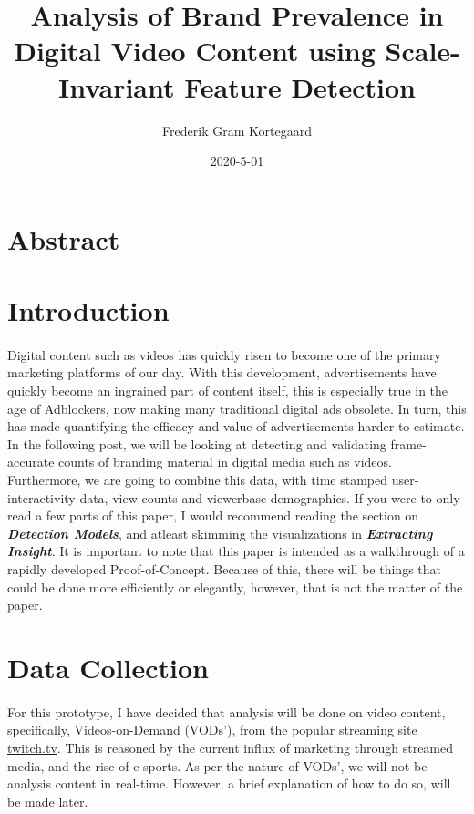 \documentclass{article}
\title{Analysis of Brand Prevalence in Digital Video Content using Scale-Invariant Feature Detection}
\date{2020-5-01}
\author{Frederik Gram Kortegaard}
\begin{document}
\maketitle
{}
\newpage
\tableofcontents
\newpage
{}

\section{Abstract}
\section{Introduction}
\paragraph{}
Digital content such as videos has quickly risen to become one of the primary marketing platforms
of our day. With this development, advertisements have quickly become an ingrained part of content
itself, this is especially true in the age of Adblockers, now making many traditional digital
ads obsolete. In turn, this has made quantifying the efficacy and value
of advertisements harder to estimate. 
\newline\newline
In the following post, we will be
looking at detecting and validating frame-accurate counts of branding
material in digital media such as videos. Furthermore, we are going to
combine this data, with time stamped user-interactivity data, view counts
and viewerbase demographics.
\newline\newline
If you were to only read a few parts of this paper, I would recommend
reading the section on \textbf{\textit{Detection Models}}, and atleast skimming the visualizations
in \textbf{\textit{Extracting Insight}}. It is important to note that this paper is intended as
a walkthrough of a rapidly developed Proof-of-Concept. Because of this, there will be things 
that could be done more efficiently or elegantly, however, that is not the matter
of the paper.

\section{Data Collection}
\paragraph{}
For this prototype, I have decided that analysis will be done on video content, specifically,
Videos-on-Demand (VODs'), from the popular streaming site \href{http://www.sharelatex.com}{twitch.tv}. 
This is reasoned by the current influx of marketing through streamed media, and the rise of e-sports.
As per the nature of VODs', we will not be analysis content in real-time. However, a brief
explanation of how to do so, will be made later.
\end{document}
